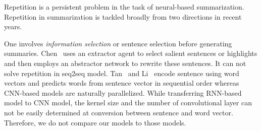 Repetition is a persistent problem in the task of 
neural-based summarization. 
Repetition in summarization is tackled broadly from two directions in recent years. 

One involves {\em information selection} or sentence
selection before generating summaries.
Chen~ uses an extractor agent 
to select salient sentences or highlights and then employs 
an abstractor network to rewrite these sentences.
It can not solve repetition in seq2seq model.
Tan~ and Li~ encode
sentence using word vectors
and predicts words from sentence vector in sequential order 
whereas CNN-based models are naturally parallelized. 
While transferring RNN-based model to CNN model, the kernel size and the number of 
convolutional layer can not be easily determined at conversion between sentence and word vector. 
Therefore, we do not compare our models to those models. 

